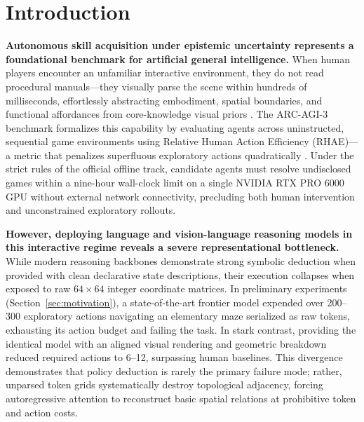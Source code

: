 \section{Introduction}
\label{sec:intro}

\textbf{Autonomous skill acquisition under epistemic uncertainty represents a foundational benchmark for artificial general intelligence.} When human players encounter an unfamiliar interactive environment, they do not read procedural manuals---they visually parse the scene within hundreds of milliseconds, effortlessly abstracting embodiment, spatial boundaries, and functional affordances from core-knowledge visual priors \citep{spelke2007core}. The ARC-AGI-3 benchmark \citep{arcagi3} formalizes this capability by evaluating agents across uninstructed, sequential game environments using Relative Human Action Efficiency (RHAE)---a metric that penalizes superfluous exploratory actions quadratically \citep{chollet2019measure}. Under the strict rules of the official offline track, candidate agents must resolve undisclosed games within a nine-hour wall-clock limit on a single NVIDIA RTX PRO 6000 GPU without external network connectivity, precluding both human intervention and unconstrained exploratory rollouts.

\textbf{However, deploying language and vision-language reasoning models in this interactive regime reveals a severe representational bottleneck.} While modern reasoning backbones demonstrate strong symbolic deduction when provided with clean declarative state descriptions, their execution collapses when exposed to raw $64{\times}64$ integer coordinate matrices. In preliminary experiments (Section~\ref{sec:motivation}), a state-of-the-art frontier model expended over 200--300 exploratory actions navigating an elementary maze serialized as raw tokens, exhausting its action budget and failing the task. In stark contrast, providing the identical model with an aligned visual rendering and geometric breakdown reduced required actions to 6--12, surpassing human baselines. This divergence demonstrates that policy deduction is rarely the primary failure mode; rather, unparsed token grids systematically destroy topological adjacency, forcing autoregressive attention to reconstruct basic spatial relations at prohibitive token and action costs.

